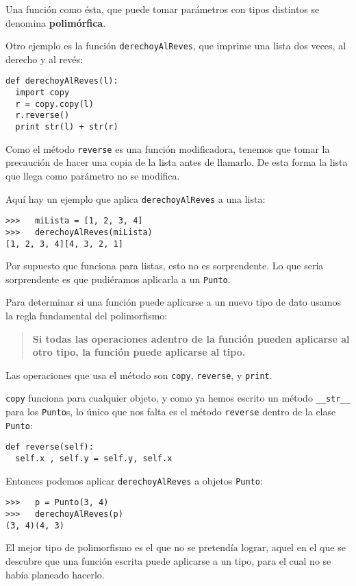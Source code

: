 Una función como ésta, que puede tomar parámetros con tipos 
distintos se denomina {\bf polimórfica}.

Otro ejemplo es la función \texttt{derechoyAlReves},
que imprime una lista dos veces, al derecho y al revés:

\beforeverb
\begin{verbatim}
def derechoyAlReves(l):
  import copy
  r = copy.copy(l)
  r.reverse()
  print str(l) + str(r)
\end{verbatim}
\afterverb
%
Como  el método \texttt{reverse} es una función modificadora, tenemos
que tomar la precaución de hacer una copia de la lista antes de 
llamarlo. De esta forma la lista que llega como parámetro no 
se modifica.

Aquí hay un ejemplo que aplica \texttt{derechoyAlReves} a una lista:

\beforeverb
\begin{verbatim}
>>>   miLista = [1, 2, 3, 4]
>>>   derechoyAlReves(miLista)
[1, 2, 3, 4][4, 3, 2, 1]
\end{verbatim}
\afterverb
%
Por supuesto que funciona para listas, esto no es sorprendente.
Lo que sería sorprendente es que pudiéramos aplicarla a
 un  \texttt{Punto}.

Para determinar si una función puede aplicarse a un nuevo
tipo de dato usamos la regla fundamental del polimorfismo:

\begin{quote}
{\bf Si todas las operaciones adentro de la función pueden 
aplicarse al otro tipo, la función puede aplicarse al tipo.}
\end{quote}

Las operaciones que usa el método son  \texttt{copy}, \texttt{reverse}, y
\texttt{print}.

\texttt{copy} funciona para cualquier objeto, y como ya hemos escrito
un método \texttt{\_\_str\_\_} para los \texttt{Punto}s, lo único que
nos falta es el método  \texttt{reverse} dentro de la clase \texttt{Punto}:

\beforeverb
\begin{verbatim}
def reverse(self):
  self.x , self.y = self.y, self.x
\end{verbatim}
\afterverb
%
Entonces podemos aplicar \texttt{derechoyAlReves} a objetos \texttt{Punto}:


\beforeverb
\begin{verbatim}
>>>   p = Punto(3, 4)
>>>   derechoyAlReves(p)
(3, 4)(4, 3)
\end{verbatim}
\afterverb
%
El mejor tipo de polimorfismo es el que no se pretendía lograr, aquel
en el que se descubre que una función escrita puede aplicarse a un 
tipo, para el cual no se había planeado hacerlo.



